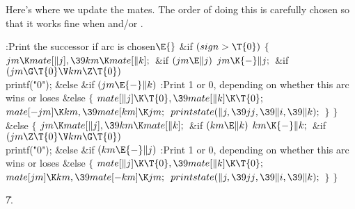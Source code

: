 Here's where we update the mates. The order of doing this is carefully
chosen so that it works fine when  and/or .

\Y\B\4:Print the successor if arc  is chosen\X${}\E{}$\6
\&{if} ${}(\\{sign}>\T{0}){}$\5
${}\{{}$\1\6
${}\\{jm}\K\\{mate}[\|j],\39\\{km}\K\\{mate}[\|k];{}$\6
\&{if} ${}(\\{jm}\E\|j){}$\1\5
${}\\{jm}\K{-}\|j;{}$\2\6
\&{if} ${}(\\{jm}\G\T{0}\V\\{km}\Z\T{0}){}$\1\5
\\{printf}(\.{"0"});\2\6
\&{else} \&{if} ${}(\\{jm}\E{-}\|k){}$\1\5
:Print 1 or 0, depending on whether this arc wins or loses\X\2\6
\&{else}\5
${}\{{}$\1\6
${}\\{mate}[\|j]\K\T{0},\39\\{mate}[\|k]\K\T{0};{}$\6
${}\\{mate}[{-}\\{jm}]\K\\{km},\39\\{mate}[\\{km}]\K\\{jm};{}$\6
${}\\{printstate}(\|j,\39\\{jj},\39\|i,\39\|k);{}$\6
\4${}\}{}$\2\6
\4${}\}{}$\5
\2\&{else}\5
${}\{{}$\1\6
${}\\{jm}\K\\{mate}[\|j],\39\\{km}\K\\{mate}[\|k];{}$\6
\&{if} ${}(\\{km}\E\|k){}$\1\5
${}\\{km}\K{-}\|k;{}$\2\6
\&{if} ${}(\\{jm}\Z\T{0}\V\\{km}\G\T{0}){}$\1\5
\\{printf}(\.{"0"});\2\6
\&{else} \&{if} ${}(\\{km}\E{-}\|j){}$\1\5
:Print 1 or 0, depending on whether this arc wins or loses\X\2\6
\&{else}\5
${}\{{}$\1\6
${}\\{mate}[\|j]\K\T{0},\39\\{mate}[\|k]\K\T{0};{}$\6
${}\\{mate}[\\{jm}]\K\\{km},\39\\{mate}[{-}\\{km}]\K\\{jm};{}$\6
${}\\{printstate}(\|j,\39\\{jj},\39\|i,\39\|k);{}$\6
\4${}\}{}$\2\6
\4${}\}{}$\2\par
\U7.\fi

